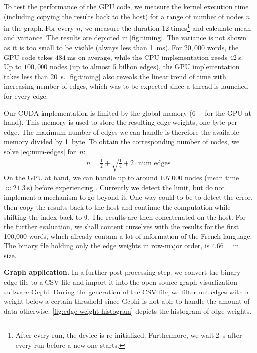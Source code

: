 \vspace{-1.5em}

To test the performance of the GPU code, we measure the kernel execution time (including copying the results back to the host) for a range of number of nodes $n$ in the graph. For every $n$, we measure the duration 12 times\footnote{After every run, the device is re-initialized. Furthermore, we wait \qty{2}{\s} after every run before a new one starts.} and calculate mean and variance. The results are depicted in \autoref{fig:timing}. The variance is not shown as it is too small to be visible (always less than \qty{1}{\ms}). For $20,000$ words, the GPU code takes $\qty{484}{\ms}$ on average, while the CPU implementation needs $\qty{42}{\s}$. Up to $100,000$ nodes (\ie up to almost 5 billion edges), the GPU implementation takes less than \qty{20}{\s}. \autoref{fig:timing} also reveals the linear trend of time with increasing number of edges, which was to be expected since a thread is launched for every edge.

Our CUDA implementation is limited by the global memory (\qty{6}{\giga\byte} for the GPU at hand). This memory is used to store the resulting edge weights, \ie one byte per edge. The maximum number of edges we can handle is therefore the available memory divided by 1~byte. To obtain the corresponding number of nodes, we solve \eqref{eq:num-edges} for~$n$:
\begin{align}
    n = \frac{1}{2} + \sqrt{\frac{1}{4} + 2 \cdot \text{num edges}}
\end{align}
On the GPU at hand, we can handle up to around 107,000 nodes (mean time $\approx \qty{21.3}{\s}$) before experiencing . Currently we detect the limit, but do not implement a mechanism to go beyond it. One way could to be to detect the error, then copy the results back to the host and continue the computation while shifting the index back to $0$. The results are then concatenated on the host. For the further evaluation, we shall content ourselves with the results for the first 100,000 words, which already contain a lot of information of the French language. The binary file holding only the edge weights in row-major order, is \qty{4.66}{\giga\byte} in size.

\textbf{Graph application.} In a further post-processing step, we convert the binary edge file to a CSV file and import it into the open-source graph visualization software \href{https://gephi.org/}{Gephi}. During the generation of the CSV file, we filter out edges with a weight below a certain threshold since Gephi is not able to handle the amount of data otherwise. \autoref{fig:edge-weight-histogram} depicts the histogram of edge weights.

